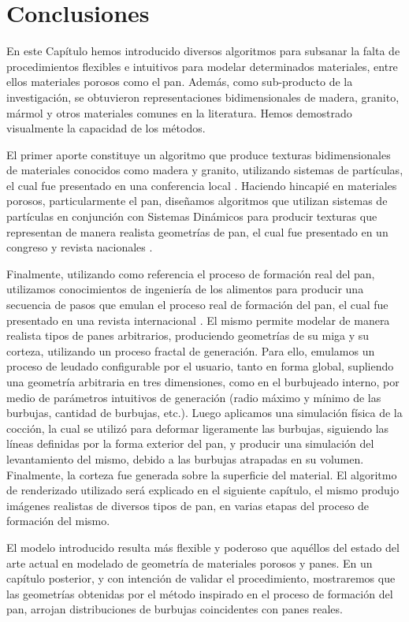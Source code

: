 \section{Conclusiones}
En este Cap\'itulo hemos introducido diversos algoritmos para subsanar la falta de procedimientos flexibles e intuitivos para modelar determinados materiales, entre ellos materiales porosos como el pan. Además, como sub-producto de la investigación, se obtuvieron representaciones bidimensionales de madera, granito, mármol y otros materiales comunes en la literatura.
Hemos demostrado visualmente la capacidad de los métodos.

El primer aporte constituye un algoritmo que produce texturas bidimensionales de materiales conocidos como madera y granito, utilizando sistemas de partículas, el cual fue presentado en una conferencia local \cite{Baravalle2011}.
Haciendo hincapié en materiales porosos, particularmente el pan, diseñamos algoritmos que utilizan sistemas de partículas en conjunción con Sistemas Dinámicos para producir texturas que representan de manera realista geometrías de pan, el cual fue presentado en un congreso y revista nacionales \cite{Baravalle2014}.

Finalmente, utilizando como referencia el proceso de formación real del pan, utilizamos conocimientos de ingeniería de los alimentos para producir una secuencia de pasos que emulan el proceso real de formación del pan, el cual fue presentado en una revista internacional \cite{Baravalle2015_2}.
El mismo permite modelar de manera realista tipos de panes arbitrarios, produciendo geometrías de su miga y su corteza, utilizando un proceso fractal de generación.
Para ello, emulamos un proceso de leudado configurable por el usuario, tanto en forma global, supliendo una geometría arbitraria en tres dimensiones, como en el burbujeado interno, por medio de parámetros intuitivos de generación (radio máximo y mínimo de las burbujas, cantidad de burbujas, etc.).
Luego aplicamos una simulación física de la cocción, la cual se utilizó para deformar ligeramente las burbujas, siguiendo las líneas definidas por la forma exterior del pan, y producir una simulación del levantamiento del mismo, debido a las burbujas atrapadas en su volumen.
Finalmente, la corteza fue generada sobre la superficie del material.
El algoritmo de renderizado utilizado será explicado en el siguiente capítulo, el mismo produjo imágenes realistas de diversos tipos de pan, en varias etapas del proceso de formación del mismo.

El modelo introducido resulta más flexible y poderoso que aquéllos del estado del arte actual en modelado de geometría de materiales porosos y panes.
En un capítulo posterior, y con intención de validar el procedimiento, mostraremos que las geometrías obtenidas por el método inspirado en el proceso de formación del pan, arrojan distribuciones de burbujas coincidentes con panes reales.

